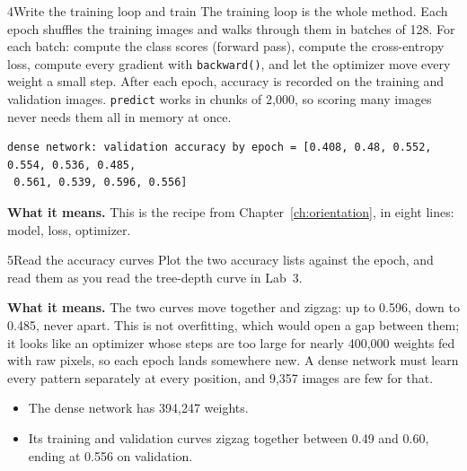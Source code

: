 \begin{labquestion}{4}{Write the training loop and train}
The training loop is the whole method. Each epoch shuffles the training images and walks through them in batches of 128. For each batch: compute the class scores (forward pass), compute the cross-entropy loss, compute every gradient with \texttt{backward()}, and let the optimizer move every weight a small step. After each epoch, accuracy is recorded on the training and validation images. \texttt{predict} works in chunks of 2,000, so scoring many images never needs them all in memory at once.
\end{labquestion}
\begin{labanswer}

\begin{refoutput}
\begin{lstlisting}[style=utpterminal]
dense network: validation accuracy by epoch = [0.408, 0.48, 0.552, 0.554, 0.536, 0.485,
 0.561, 0.539, 0.596, 0.556]
\end{lstlisting}
\end{refoutput}

\textbf{What it means.} This is the recipe from Chapter~\ref{ch:orientation}, in eight lines: model, loss, optimizer.
\end{labanswer}

\begin{labquestion}{5}{Read the accuracy curves}
Plot the two accuracy lists against the epoch, and read them as you read the tree-depth curve in Lab~3.
\end{labquestion}
\begin{labanswer}


\textbf{What it means.} The two curves move together and zigzag: up to 0.596, down to 0.485, never apart. This is not overfitting, which would open a gap between them; it looks like an optimizer whose steps are too large for nearly 400,000 weights fed with raw pixels, so each epoch lands somewhere new. A dense network must learn every pattern separately at every position, and 9,357 images are few for that.
\end{labanswer}

\begin{labcheckpoint}
\begin{itemize}[leftmargin=1.2em,itemsep=2pt,topsep=1pt]
  \item The dense network has 394,247 weights.
  \item Its training and validation curves zigzag together between 0.49 and 0.60, ending at 0.556 on validation.
\end{itemize}
\end{labcheckpoint}

